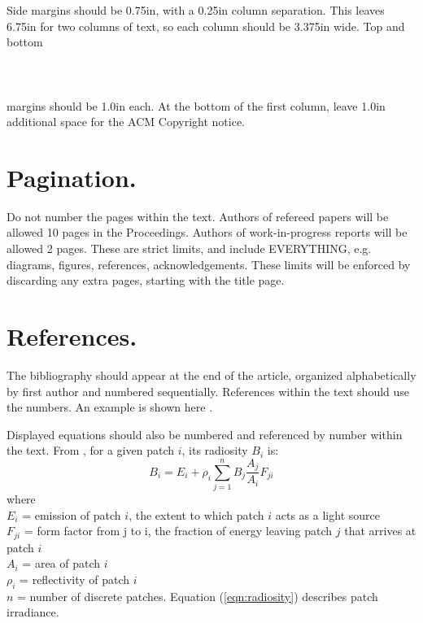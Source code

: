 \documentclass[twocolumn]{article}
\begin{document}
Side margins should be 0.75in, with a 0.25in column separation.
This leaves 6.75in for two columns of text, so each
column should be 3.375in wide.  Top and bottom 
\quad\\
\quad\\
\quad\\
\quad\\
margins should be 1.0in each.  At the bottom of the first column, 
leave 1.0in additional space for the ACM Copyright notice.

\section{Pagination.}

Do not number the pages within the text.  
Authors of refereed papers will be allowed 10 pages in the Proceedings.
Authors of work-in-progress reports will be allowed 2 pages.  These
are strict limits, and include EVERYTHING, e.g. diagrams, figures,
references, acknowledgements. These limits will be enforced by discarding 
any extra pages, starting with the title page.

\section{References.}

The bibliography should appear at the end of the article, organized
alphabetically by first author and numbered sequentially.  References
within the text should use the numbers.  An example is shown here
\cite{danforth}.

Displayed equations should also be numbered and referenced by number
within the text.  From \cite{cohen:progressive},
for a given patch $i$, its radiosity $B_i$ is:
\begin{equation}
\label{eqn:radiosity}
	B_i = E_i + \rho_i \sum_{j = 1}^{n} B_j \frac{A_j}{A_i} F_{ji}
\end{equation}
where \\
$E_i$ =  emission of patch $i$, the extent to which patch $i$ acts as
        a light source\\
$F_{ji}$ =  form factor from j to i, the fraction of 
energy leaving patch $j$ that arrives at patch $i$ \\
$A_i$ = area of patch $i$ \\
$\rho_i$ = reflectivity of patch $i$ \\
$n$ = number of discrete patches.  
Equation (\ref{eqn:radiosity}) describes patch irradiance.
\end{document}
